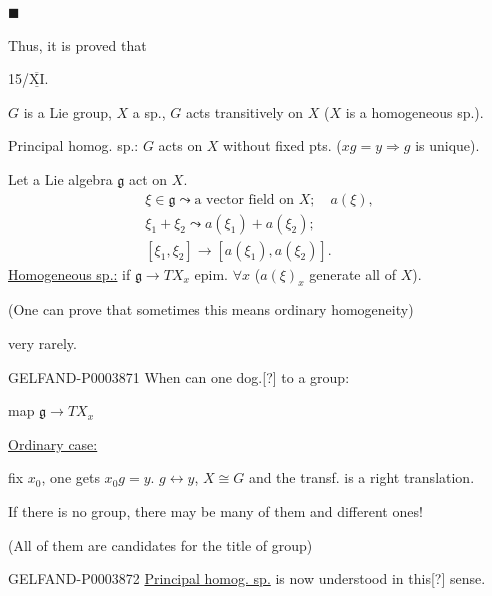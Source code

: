 $\blacksquare$

Thus, it is proved that 


15/$\overline{\underline{\mathrm{XI}}}$. 

$G$ is a Lie group, $X$ a sp., $G$ acts transitively on $X$
($X$ is a homogeneous sp.).

Principal homog. sp.: $G$ acts on $X$ without fixed pts.
($xg=y\Rightarrow g$ is unique).


Let a Lie algebra $\mathfrak{g}$ act on $X$.
\begin{gather*}
\xi\in\mathfrak{g}\leadsto\text{a vector field on }X;\quad a (\xi),\\
\xi_1+\xi_2\leadsto a (\xi_1)+a (\xi_2);\\
[\xi_1,\xi_2]\longrightarrow[a (\xi_1), a (\xi_2)].
\end{gather*}
\underline{Homogeneous sp.:} if $\mathfrak{g}\longrightarrow TX_x$ epim. $\forall x$
($a (\xi)_x$ generate all of $X$).

(One can prove that sometimes this means ordinary homogeneity)

very rarely.

\begin{GelfandAdjacentEvidence}{GELFAND-P000387}{1}
When can one dog.[?] to a group:
\end{GelfandAdjacentEvidence}



 map $\mathfrak{g}\longrightarrow TX_x$

\underline{Ordinary case:}

fix $x_0$, one gets $x_0g=y$. $g\leftrightarrow y$, $X\cong G$
and the transf. is a right translation.

If there is no group, there may be many of them and different ones!

(All of them are candidates for the title of group)

\begin{GelfandAdjacentEvidence}{GELFAND-P000387}{2}
\underline{Principal homog. sp.} is now understood in this[?] sense.
\end{GelfandAdjacentEvidence}


